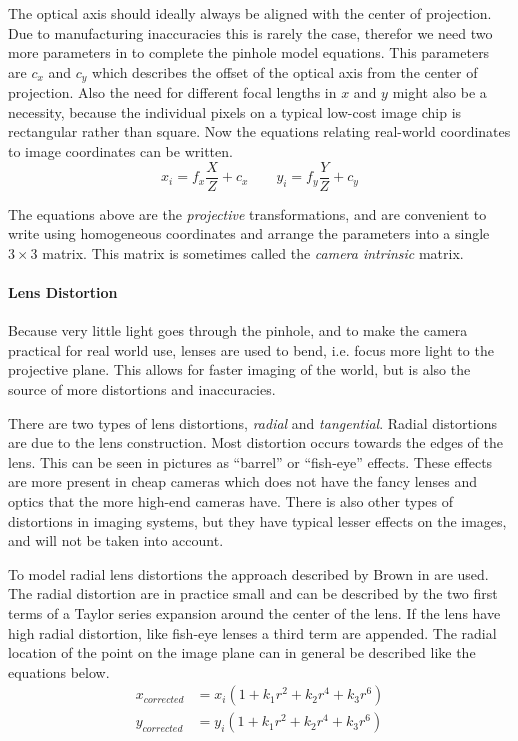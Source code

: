 The optical axis should ideally always be aligned with the center of projection. Due to
manufacturing inaccuracies this is rarely the case, therefor we need two more parameters
in to complete the pinhole model equations. This parameters are $c_x$ and $c_y$ which
describes the offset of the optical axis from the center of projection. Also the need for
different focal lengths in $x$ and $y$ might also be a necessity, because the individual
pixels on a typical low-cost image chip is rectangular rather than square. Now the
equations relating real-world coordinates to image coordinates can be written.
\cite{openCV}
\begin{equation}
    x_i = f_x \frac{X}{Z} + c_x \quad \quad y_i = f_y \frac{Y}{Z} + c_y
\end{equation}

The equations above are the \emph{projective} transformations, and are convenient to
write using homogeneous coordinates and arrange the parameters into a single $3\times 3$
matrix. This matrix is sometimes called the \emph{camera intrinsic} matrix. 

\paragraph{Lens Distortion}
Because very little light goes through the pinhole, and to make the camera practical for
real world use, lenses are used to bend, i.e. focus more light to the projective plane.
This allows for faster imaging of the world, but is also the source of more distortions
and inaccuracies. 

There are two types of lens distortions, \emph{radial} and \emph{tangential}. Radial
distortions are due to the lens construction. Most distortion occurs towards the edges of
the lens. This can be seen in pictures as ``barrel'' or ``fish-eye'' effects. These
effects are more present in cheap cameras which does not have the fancy lenses and optics
that the more high-end cameras have. There is also other types of distortions in imaging
systems, but they have typical lesser effects on the images, and will not be taken into
account. 

To model radial lens distortions the approach described by Brown in
\cite{lens-calibration} are used. The radial distortion are in practice small and can be
described by the two first terms of a Taylor series expansion around the center of the
lens. If the lens have high radial distortion, like fish-eye lenses a third term are
appended. The radial location of the point on the image plane can in general be described
like the equations below. 
\begin{equation}
\begin{aligned}
    x_{corrected} &= x_i ( 1 + k_1 r^2 + k_2 r^4 + k_3 r^6 ) \\
    y_{corrected} &= y_i ( 1 + k_1 r^2 + k_2 r^4 + k_3 r^6 ) 
\end{aligned}
\end{equation}

